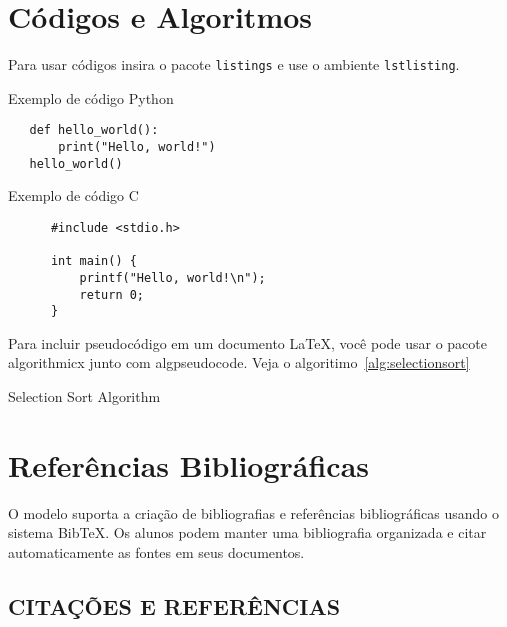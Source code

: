 \documentclass[
	article,			%
	11pt,				%
	oneside,			%
	a4paper,			%
	chapter=TITLE,
	english,			%
	brazil,				%
	sumario=tradicional
	]{templateimtec}
\begin{document}
\section{Códigos e Algoritmos}


Para usar códigos insira o pacote \texttt{listings} e use o ambiente \texttt{lstlisting}.

\begin{codigo}[ht]
   \caption{Exemplo de código Python}
\lstset{language=Python}
\begin{lstlisting}
   def hello_world():
       print("Hello, world!")
   hello_world()
   \end{lstlisting}
\end{codigo}


\begin{codigo}[ht]
\caption{Exemplo de código C}
   \lstset{language=C}
   \begin{lstlisting}
      #include <stdio.h>
      
      int main() {
          printf("Hello, world!\n");
          return 0;
      }
      \end{lstlisting}

\end{codigo}

Para incluir pseudocódigo em um documento LaTeX, você pode usar o pacote algorithmicx junto com algpseudocode. Veja o algoritimo~\ref{alg:selectionsort}

\begin{algorithm}[ht]
	\caption{Selection Sort Algorithm}
	\label{alg:selectionsort}
	\begin{algorithmic}[1]
	\EndIf
	\EndFor
	\EndFor
	\EndProcedure
	\end{algorithmic}
\end{algorithm}
   

\section{Referências Bibliográficas}

O modelo suporta a criação de bibliografias e referências bibliográficas usando o sistema BibTeX. Os alunos podem manter uma bibliografia organizada e citar automaticamente as fontes em seus documentos.

\subsection{CITAÇÕES E REFERÊNCIAS}
\end{document}
